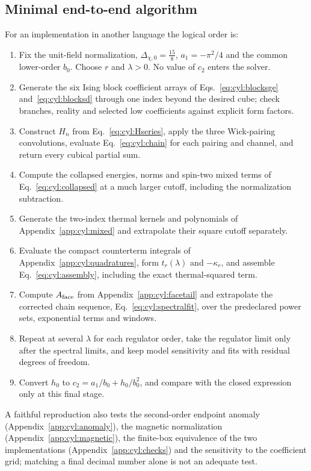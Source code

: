 \documentclass[11pt,a4paper]{article}
\numberwithin{equation}{section}
\begin{document}
\subsection{Minimal end-to-end algorithm}\label{app:cyl:algorithm}
For an implementation in another language the logical order is:
\begin{enumerate}[leftmargin=2em]
\item Fix the unit-field normalization, $\Delta_{\chi,0}=\frac{15}8$, $a_1=-\pi^2/4$ and the common lower-order $b_0$.
 Choose $r$ and $\lambda>0$. No value of $c_2$ enters the solver.
\item Generate the six Ising block coefficient arrays of Eqs.~\eqref{eq:cyl:blocksge} and~\eqref{eq:cyl:blocksd} through
 one index beyond the desired cube; check branches, reality and selected low coefficients against explicit form
 factors.
\item Construct $H_n$ from Eq.~\eqref{eq:cyl:Hseries}, apply the three Wick-pairing convolutions, evaluate
 Eq.~\eqref{eq:cyl:chain} for each pairing and channel, and return every cubical partial sum.
\item Compute the collapsed energies, norms and spin-two mixed terms of Eq.~\eqref{eq:cyl:collapsed} at a much larger
 cutoff, including the normalization subtraction.
\item Generate the two-index thermal kernels and polynomials of Appendix~\ref{app:cyl:mixed} and extrapolate their square
 cutoff separately.
\item Evaluate the compact counterterm integrals of Appendix~\ref{app:cyl:quadratures}, form $t_r(\lambda)$ and
 $-\kappa_r$, and assemble Eq.~\eqref{eq:cyl:assembly}, including the exact thermal-squared term.
\item Compute $A_{\rm face}$ from Appendix~\ref{app:cyl:facetail} and extrapolate the corrected chain sequence,
 Eq.~\eqref{eq:cyl:spectralfit}, over the predeclared power sets, exponential terms and windows.
\item Repeat at several $\lambda$ for each regulator order, take the regulator limit only after the spectral limits,
 and keep model sensitivity and fits with residual degrees of freedom.
\item Convert $h_0$ to $c_2=a_1/b_0+h_0/b_0^2$, and compare with the closed expression only at this final stage.
\end{enumerate}
A faithful reproduction also tests the second-order endpoint anomaly (Appendix~\ref{app:cyl:anomaly}), the magnetic
normalization (Appendix~\ref{app:cyl:magnetic}), the finite-box equivalence of the two implementations
(Appendix~\ref{app:cyl:checks}) and the sensitivity to the coefficient grid; matching a final decimal number alone is not an
adequate test.
\end{document}
